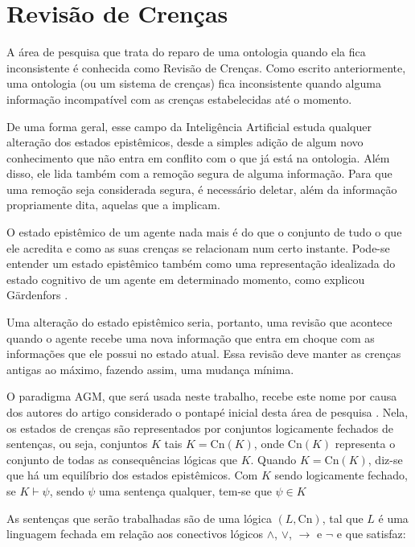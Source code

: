 
\chapter{Revisão de Crenças}

\lettrine{A}{} área de pesquisa que trata do reparo de uma ontologia quando ela fica inconsistente é conhecida como Revisão de Crenças. Como escrito anteriormente, uma ontologia (ou um sistema de crenças) fica inconsistente quando alguma informação incompatível com as crenças estabelecidas até o momento.

De uma forma geral, esse campo da Inteligência Artificial estuda qualquer alteração dos estados epistêmicos, desde a simples adição de algum novo conhecimento que não entra em conflito com o que já está na ontologia. Além disso, ele lida também com a remoção segura de alguma informação. Para que uma remoção seja considerada segura, é necessário deletar, além da informação propriamente dita, aquelas que a implicam. 

O estado epistêmico de um agente nada mais é do que o conjunto de tudo o que ele acredita e como as suas crenças se relacionam num certo instante. Pode-se entender um estado epistêmico também como uma representação idealizada do estado cognitivo de um agente em determinado momento, como explicou Gärdenfors \cite{revisaoGardenfors}.

Uma alteração do estado epistêmico seria, portanto, uma revisão que acontece quando o agente recebe uma nova informação que entra em choque com as informações que ele possui no estado atual. Essa revisão deve manter as crenças antigas ao máximo, fazendo assim, uma mudança mínima.

O paradigma AGM, que será usada neste trabalho, recebe este nome por causa dos autores do artigo considerado o pontapé inicial desta área de pesquisa \cite{revisaoAGM}. Nela, os estados de crenças são representados por conjuntos logicamente fechados de sentenças, ou seja, conjuntos $ K $ tais $ K = \text{Cn}(K) $, onde $ \text{Cn}(K) $ representa o conjunto de todas as consequências lógicas que $ K $. Quando $ K = \text{Cn}(K) $, diz-se que há um equilíbrio dos estados epistêmicos. Com $ K $ sendo logicamente fechado, se $ K \vdash \psi $, sendo $ \psi $ uma sentença qualquer, tem-se que $ \psi \in K $

As sentenças que serão trabalhadas são de uma lógica $ (L, \text{Cn}) $, tal que $ L $ é uma linguagem fechada em relação aos conectivos lógicos $ \land $, $ \lor $, $ \to $ e $ \lnot $ e que satisfaz:

